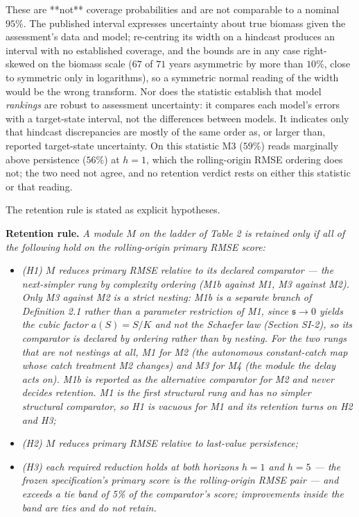 \documentclass[11pt]{article}
\providecommand{\tightlist}{\setlength{\itemsep}{0pt}\setlength{\parskip}{0pt}}
\begin{document}
These are **not** coverage probabilities and are not comparable to a
nominal \(95\%\). The published interval expresses uncertainty about
true biomass given the assessment's data and model; re-centring its
width on a hindcast produces an interval with no established coverage,
and the bounds are in any case right-skewed on the biomass scale
(\(67\) of \(71\) years asymmetric by more than \(10\%\), close to
symmetric only in logarithms), so a symmetric normal reading of the
width would be the wrong transform. Nor does the statistic establish
that model \emph{rankings} are robust to assessment uncertainty: it
compares each model's errors with a target-state interval, not the
differences between models. It indicates only that hindcast
discrepancies are mostly of the same order as, or larger than, reported
target-state uncertainty. On this statistic M3 (\(59\%\)) reads
marginally above persistence (\(56\%\)) at \(h=1\), which the
rolling-origin RMSE ordering does not; the two need not agree, and no
retention verdict rests on either this statistic or that reading.

The retention rule is stated as explicit hypotheses.

\textbf{Retention rule.} \emph{A module \(M\) on the ladder of Table 2
is retained only if all of the following hold on the rolling-origin
primary RMSE score:}

\begin{itemize}
\tightlist
\item
  \emph{(H1) \(M\) reduces primary RMSE relative to its declared
  comparator --- the next-simpler rung by complexity ordering (M1b against
  M1, M3 against M2). Only M3 against M2 is a strict nesting: M1b is a
  separate branch of Definition 2.1 rather than a parameter restriction
  of M1, since \(\mathfrak s \to 0\) yields the cubic factor
  \(a(S)=S/K\) and not the Schaefer law (Section SI-2), so its
  comparator is declared by ordering rather than by nesting. For the two
  rungs that are not nestings at all, M1
  for M2 (the autonomous constant-catch map whose catch treatment M2
  changes) and M3 for M4 (the module the delay acts on). M1b is reported
  as the alternative comparator for M2 and never decides retention. M1
  is the first structural rung and has no simpler structural comparator,
  so H1 is vacuous for M1 and its retention turns on H2 and H3;}
\item
  \emph{(H2) \(M\) reduces primary RMSE relative to last-value
  persistence;}
\item
  \emph{(H3) each required reduction holds at both horizons \(h=1\) and
  \(h=5\) --- the frozen specification's primary score is the
  rolling-origin RMSE pair --- and exceeds a tie band of 5\% of the
  comparator's score; improvements inside the band are ties and do not
  retain.}
\end{itemize}
\end{document}
